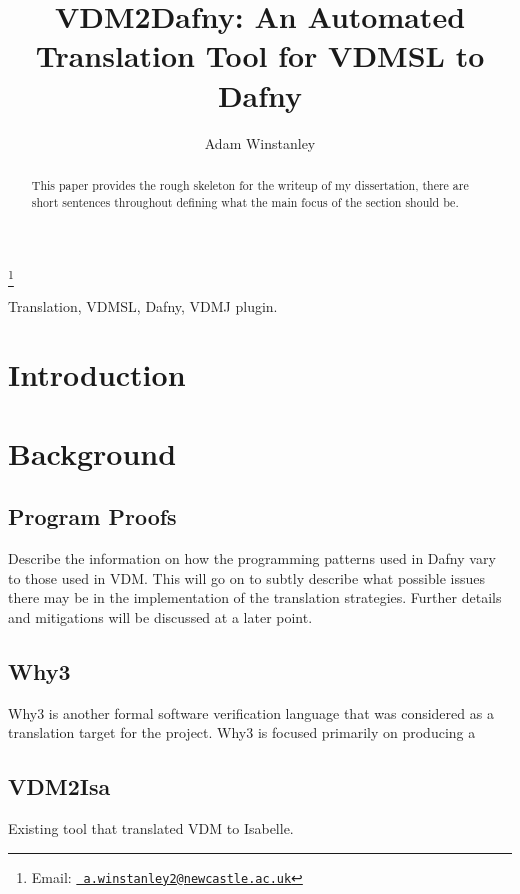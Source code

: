 \documentclass{entcs}
\begin{document}
\begin{frontmatter}
\title{VDM2Dafny: An Automated Translation Tool for VDMSL to Dafny}
\author{Adam Winstanley}
  \address{School of Computing Science, Newcastle University, UK} 
\thanks[adamemail]{Email:
    \href{mailto:a.winstanley2@newcastle.ac.uk} {\texttt{\normalshape
        a.winstanley2@newcastle.ac.uk}}}

			
				
\begin{abstract} 
This paper provides the rough skeleton for the writeup of my dissertation, there are short sentences throughout defining what the main focus of the section should be.
\end{abstract}

\begin{keyword}
Translation, VDMSL, Dafny, VDMJ plugin.
\end{keyword}
\end{frontmatter}

\section{Introduction}

\section{Background}

\subsection{Program Proofs}
Describe the information on how the programming patterns used in Dafny vary to those used in VDM. This will go on to subtly describe what possible issues there may be in the implementation of the translation strategies. Further details and mitigations will be discussed at a later point.

\subsection{Why3}
Why3 is another formal software verification language that was considered as a translation target for the project. Why3 is focused primarily on producing a 

\cite{why3}

\subsection{VDM2Isa}
Existing tool that translated VDM to Isabelle.
\cite{VDMToolkit}
\end{document}
